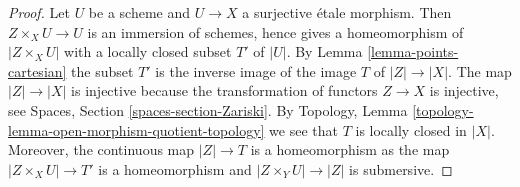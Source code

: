 \documentclass[10pt,a4paper]{amsart}
\theoremstyle{plain}
\theoremstyle{definition}
\theoremstyle{remark}
\numberwithin{equation}{subsection}
\begin{document}
\begin{proof}
Let $U$ be a scheme and $U \to X$ a surjective \'etale morphism.
Then $Z \times_X U \to U$ is an immersion of schemes, hence gives a
homeomorphism of $|Z \times_X U|$ with a locally closed subset $T'$
of $|U|$. By Lemma \ref{lemma-points-cartesian} the subset
$T'$ is the inverse image of the image $T$ of $|Z| \to |X|$.
The map $|Z| \to |X|$ is injective because the transformation of
functors $Z \to X$ is injective, see
Spaces, Section \ref{spaces-section-Zariski}. By
Topology, Lemma \ref{topology-lemma-open-morphism-quotient-topology}
we see that $T$ is locally closed in $|X|$. Moreover, the continuous
map $|Z| \to T$ is a homeomorphism as the map $|Z \times_X U| \to T'$
is a homeomorphism and $|Z \times_Y U| \to |Z|$ is submersive.
\end{proof}
\end{document}
